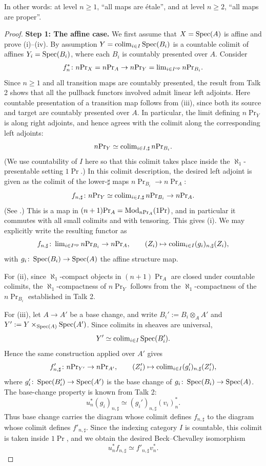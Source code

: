 \documentclass[11pt]{book}
\begin{document}
	In other words: at level $n \geq 1$, ``all maps are étale'', and at level $n \geq 2$, ``all maps are proper''.

	\begin{proof}
		\textbf{Step 1: The affine case.} We first assume that $X = \operatorname{Spec}(A)$ is affine and prove (i)--(iv). By assumption $Y = \operatorname{colim}_{i \in I} \operatorname{Spec}(B_i)$ is a countable colimit of affines $Y_i = \operatorname{Spec}(B_i)$, where each $B_i$ is countably presented over $A$. Consider
		\[
			f_n^*\colon n\textup{Pr}_X = n\textup{Pr}_A \to n\textup{Pr}_Y = \operatorname{lim}_{i \in I^{\textup{op}}} n\textup{Pr}_{B_i}.
		\]
		Since $n \geq 1$ and all transition maps are countably presented, the result from Talk 2 shows that all the pullback functors involved admit linear left adjoints. Here countable presentation of a transition map follows from (iii), since both its source and target are countably presented over $A$. In particular, the limit defining $n\Pr_Y$ is along right adjoints, and hence agrees with the colimit along the corresponding left adjoints:
		\[
			n\textup{Pr}_Y \simeq \operatorname{colim}_{i \in I, \sharp} n\textup{Pr}_{B_i}.
		\]
		(We use countability of $I$ here so that this colimit takes place inside the $\aleph_1$-presentable setting $1\Pr$.) In this colimit description, the desired left adjoint is given as the colimit of the lower-$\sharp$ maps $n\Pr_{B_i} \to n\Pr_A$:
		\[
			f_{n,\sharp}\colon n\textup{Pr}_Y \simeq \operatorname{colim}_{i \in I, \sharp} n\textup{Pr}_{B_i} \to n\textup{Pr}_A.
		\]
		(See \citet[Corollary~1.3]{HorevYanovski2017Descent}.) This is a map in $(n+1)\textup{Pr}_A = {\textup{Mod}}_{n\textup{Pr}_A}(1\textup{Pr})$, and in particular it commutes with all small colimits and with tensoring. This gives (i). We may explicitly write the resulting functor as
		\[
			f_{n,\sharp}\colon \operatorname{lim}_{i \in I^{\textup{op}}} n\textup{Pr}_{B_i} \to n\textup{Pr}_A, \qquad (Z_i) \mapsto \operatorname{colim}_{i \in I} (g_i)_{n,\sharp}(Z_i),
		\]
		with $g_i\colon \operatorname{Spec}(B_i) \to \operatorname{Spec}(A)$ the affine structure map.

		For (ii), since $\aleph_1$-compact objects in $(n+1)\Pr_A$ are closed under countable colimits, the $\aleph_1$-compactness of $n\Pr_Y$ follows from the $\aleph_1$-compactness of the $n\Pr_{B_i}$ established in Talk 2.
		
		For (iii), let $A \to A'$ be a base change, and write $B_i' := B_i \otimes_A A'$ and $Y' := Y \times_{\operatorname{Spec}(A)} \operatorname{Spec}(A')$. Since colimits in sheaves are universal,
		\[
			Y' \simeq \operatorname{colim}_{i \in I} \operatorname{Spec}(B_i').
		\]
		Hence the same construction applied over $A'$ gives
		\[
			f'_{n,\sharp}\colon n\textup{Pr}_{Y'} \to n\textup{Pr}_{A'}, \qquad (Z'_i) \mapsto \operatorname{colim}_{i \in I} (g'_i)_{n,\sharp}(Z'_i),
		\]
		where $g'_i\colon \operatorname{Spec}(B_i') \to \operatorname{Spec}(A')$ is the base change of $g_i\colon \operatorname{Spec}(B_i) \to \operatorname{Spec}(A)$. The base-change property is known from Talk 2:
		\[
			u_n^* (g_i)_{n,\sharp} \simeq (g_i')_{n,\sharp} (v_i)_n^*.
		\]
		Thus base change carries the diagram whose colimit defines $f_{n,\sharp}$ to the diagram whose colimit defines $f'_{n,\sharp}$. Since the indexing category $I$ is countable, this colimit is taken inside $1\Pr$, and we obtain the desired Beck--Chevalley isomorphism
		\[
			u_n^* f_{n,\sharp} \simeq f'_{n,\sharp} v_n^*.
		\]


\end{proof}
\end{document}
